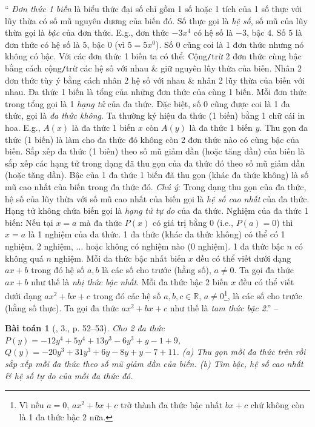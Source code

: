 \documentclass{article}
\newtheorem{baitoan}{Bài toán}
\begin{document}
`` \textit{Đơn thức 1 biến} là biểu thức đại số chỉ gồm 1 số hoặc 1 tích của 1 số thực với lũy thừa có số mũ nguyên dương của biến đó. Số thực gọi là \textit{hệ số}, số mũ của lũy thừa gọi là \textit{bậc} của đơn thức. E.g., đơn thức $-3x^4$ có hệ số là $-3$, bậc $4$. Số $5$ là đơn thức có hệ số là $5$, bậc $0$ (vì $5 = 5x^0$). Số $0$ cũng coi là 1 đơn thức nhưng nó không có bậc.  Với các đơn thức 1 biến ta có thể: Cộng\texttt{/}trừ 2 đơn thức cùng bậc bằng cách cộng\texttt{/}trừ các hệ số với nhau \& giữ nguyên lũy thừa của biến. Nhân 2 đơn thức tùy ý bằng cách nhân 2 hệ số với nhau \& nhân 2 lũy thừa của biến với nhau.  Đa thức 1 biến là tổng của những đơn thức của cùng 1 biến. Mỗi đơn thức trong tổng gọi là 1 \textit{hạng tử} của đa thức. Đặc biệt, số 0 cũng được coi là 1 đa thức, gọi là \textit{đa thức không}. Ta thường ký hiệu đa thức (1 biến) bằng 1 chữ cái in hoa. E.g., $A(x)$ là đa thức 1 biến $x$ còn $A(y)$ là đa thức 1 biến $y$.  Thu gọn đa thức (1 biến) là làm cho đa thức đó không còn 2 đơn thức nào có cùng bậc của biến. Sắp xếp đa thức (1 biến) theo số mũ giảm dần (hoặc tăng dần) của biến là sắp xếp các hạng tử trong dạng đã thu gọn của đa thức đó theo số mũ giảm dần (hoặc tăng dần).  Bậc của 1 đa thức 1 biến đã thu gọn (khác đa thức không) là số mũ cao nhất của biến trong đa thức đó. \textit{Chú ý}: Trong dạng thu gọn của đa thức, hệ số của lũy thừa với số mũ cao nhất của biến gọi là \textit{hệ số cao nhất} của đa thức. Hạng tử không chứa biến gọi là \textit{hạng tử tự do} của đa thức.  Nghiệm của đa thức 1 biến: Nếu tại $x = a$ mà đa thức $P(x)$ có giá trị bằng $0$ (i.e., $P(a) = 0$) thì $x = a$ là 1 nghiệm của đa thức.  1 đa thức (khác đa thức không) có thể có 1 nghiệm, 2 nghiệm, $\ldots$ hoặc không có nghiệm nào (0 nghiệm). 1 đa thức bậc $n$ có không quá $n$ nghiệm.  Mỗi đa thức bậc nhất biến $x$ đều có thể viết dưới dạng $ax + b$ trong đó hệ số $a,b$ là các số cho trước (hằng số), $a\ne0$. Ta gọi đa thức $ax + b$ như thế là \textit{nhị thức bậc nhất}. Mỗi đa thức bậc 2 biến $x$ đều có thể viết dưới dạng $ax^2 + bx + c$ trong đó các hệ số $a,b,c\in\mathbb{R}$, $a\ne 0$\footnote{Vì nếu $a = 0$, $ax^2 + bx + c$ trở thành đa thức bậc nhất $bx + c$ chứ không còn là 1 đa thức bậc 2 nữa.}, là các số cho trước (hằng số thực). Ta gọi đa thức $ax^2 + bx + c$ như thế là \textit{tam thức bậc 2}.'' -- \cite[Chap. III, \S2, p. 39]{Tuyen_Toan_7}

\begin{baitoan}[\cite{SGK_Toan_7_Canh_Dieu_tap_2}, 3., p. 52--53]
	Cho 2 đa thức $P(y) = -12y^4 + 5y^4 + 13y^3 - 6y^3 + y -1 + 9$, $Q(y) = -20y^3 + 31y^3 + 6y - 8y + y - 7 + 11$. (a) Thu gọn mỗi đa thức trên rồi sắp xếp mỗi đa thức theo số mũ giảm dần của biến. (b) Tìm bậc, hệ số cao nhất \& hệ số tự do của mỗi đa thức đó.
\end{baitoan}
\end{document}
